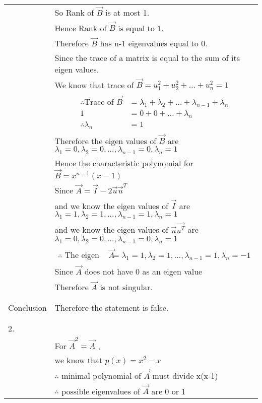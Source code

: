 \documentclass[journal,12pt]{IEEEtran}
\begin{document}
\begin{longtable}{|l|l|}
&So Rank of $\vec{B}$ is at most 1.\\
&Hence Rank of $\vec{B}$ is equal to 1.\\
&Therefore $\vec{B}$ has n-1 eigenvalues equal to 0.\\
&Since the trace of a matrix is equal to the sum of its eigen values.\\
&We know that trace of $\vec{B}=u_1^2+u_2^2+\dots+u_n^2=1$\\
&\parbox{10cm}{\begin{align*}
    \therefore\mbox{Trace of }\vec{B}&=\lambda_1+\lambda_2+\dots+\lambda_{n-1}+\lambda_n\\
    1&=0+0+\dots+\lambda_n\\
    \therefore \lambda_n&=1
\end{align*}}\\
&Therefore the eigen values of $\vec{B}$ are $\lambda_1=0,\lambda_2=0,\dots,\lambda_{n-1}=0,\lambda_n=1$\\
&Hence the characteristic polynomial for $\vec{B}=x^{n-1}(x-1)$\\
&Since $\vec{A}=\vec{I}-2\vec{u}\vec{u}^T$\\
&and we know the eigen values of $\vec{I}$ are $\lambda_1=1,\lambda_2=1,\dots,\lambda_{n-1}=1,\lambda_n=1$\\
&and we know the eigen values of $\vec{u}\vec{u^T}$ are $\lambda_1=0,\lambda_2=0,\dots,\lambda_{n-1}=0,\lambda_n=1$\\
&\parbox{15cm}{\begin{align}
 \therefore\mbox{ The eigen values of }\vec{A}&=\lambda_1=1,\lambda_2=1,\dots,\lambda_{n-1}=1,\lambda_n=-1\label{eq:eigen_values_of_A}   
\end{align}}\\
&Since $\vec{A}$ does not have 0 as an eigen value\\
&Therefore $\vec{A}$ is not singular.\\
&\\
\hline
&\\
Conclusion&Therefore the statement is false.\\
&\\
\hline
&\\
2.&\\
& For $\vec{A}^2=\vec{A}$ ,\\
&we know that $p(x)=x^2-x$\\
&$\therefore$ minimal polynomial of $\vec{A}$ must divide x(x-1)\\
&$\therefore$ possible eigenvalues of $\vec{A}$ are 0 or 1\\

\end{longtable}
\end{document}
